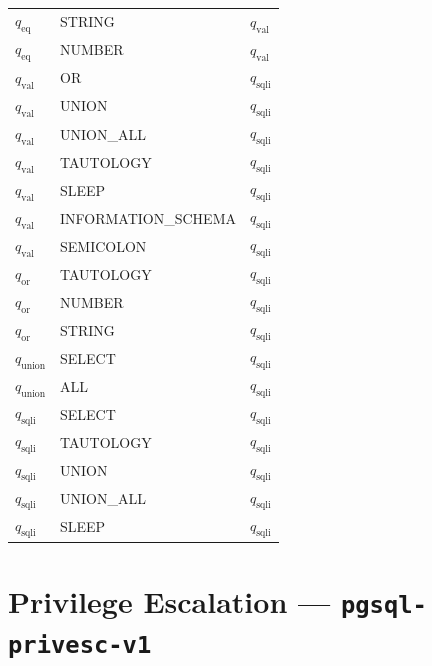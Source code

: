 \documentclass[12pt, a4paper]{report}
\theoremstyle{definition}
\theoremstyle{remark}
\begin{document}
\begin{center}
\begin{longtable}{lll}
  \midrule
  $q_{\text{eq}}$ & STRING         & $q_{\text{val}}$    \\
  $q_{\text{eq}}$ & NUMBER         & $q_{\text{val}}$    \\
  \midrule
  $q_{\text{val}}$ & OR            & $q_{\text{sqli}}$   \\
  $q_{\text{val}}$ & UNION         & $q_{\text{sqli}}$   \\
  $q_{\text{val}}$ & UNION\_ALL    & $q_{\text{sqli}}$   \\
  $q_{\text{val}}$ & TAUTOLOGY     & $q_{\text{sqli}}$   \\
  $q_{\text{val}}$ & SLEEP         & $q_{\text{sqli}}$   \\
  $q_{\text{val}}$ & INFORMATION\_SCHEMA & $q_{\text{sqli}}$ \\
  $q_{\text{val}}$ & SEMICOLON     & $q_{\text{sqli}}$   \\
  \midrule
  $q_{\text{or}}$ & TAUTOLOGY      & $q_{\text{sqli}}$   \\
  $q_{\text{or}}$ & NUMBER         & $q_{\text{sqli}}$   \\
  $q_{\text{or}}$ & STRING         & $q_{\text{sqli}}$   \\
  \midrule
  $q_{\text{union}}$ & SELECT      & $q_{\text{sqli}}$   \\
  $q_{\text{union}}$ & ALL         & $q_{\text{sqli}}$   \\
  \midrule
  $q_{\text{sqli}}$ & SELECT       & $q_{\text{sqli}}$   \\
  $q_{\text{sqli}}$ & TAUTOLOGY    & $q_{\text{sqli}}$   \\
  $q_{\text{sqli}}$ & UNION        & $q_{\text{sqli}}$   \\
  $q_{\text{sqli}}$ & UNION\_ALL   & $q_{\text{sqli}}$   \\
  $q_{\text{sqli}}$ & SLEEP        & $q_{\text{sqli}}$   \\
  \bottomrule
\end{longtable}
\end{center}

\section{Privilege Escalation — \texttt{pgsql-privesc-v1}}
\end{document}
